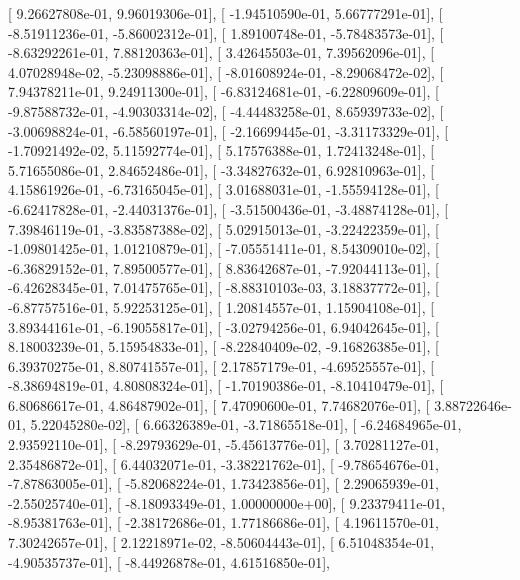 \documentclass{article}
\begin{document}
       [  9.26627808e-01,   9.96019306e-01],
       [ -1.94510590e-01,   5.66777291e-01],
       [ -8.51911236e-01,  -5.86002312e-01],
       [  1.89100748e-01,  -5.78483573e-01],
       [ -8.63292261e-01,   7.88120363e-01],
       [  3.42645503e-01,   7.39562096e-01],
       [  4.07028948e-02,  -5.23098886e-01],
       [ -8.01608924e-01,  -8.29068472e-02],
       [  7.94378211e-01,   9.24911300e-01],
       [ -6.83124681e-01,  -6.22809609e-01],
       [ -9.87588732e-01,  -4.90303314e-02],
       [ -4.44483258e-01,   8.65939733e-02],
       [ -3.00698824e-01,  -6.58560197e-01],
       [ -2.16699445e-01,  -3.31173329e-01],
       [ -1.70921492e-02,   5.11592774e-01],
       [  5.17576388e-01,   1.72413248e-01],
       [  5.71655086e-01,   2.84652486e-01],
       [ -3.34827632e-01,   6.92810963e-01],
       [  4.15861926e-01,  -6.73165045e-01],
       [  3.01688031e-01,  -1.55594128e-01],
       [ -6.62417828e-01,  -2.44031376e-01],
       [ -3.51500436e-01,  -3.48874128e-01],
       [  7.39846119e-01,  -3.83587388e-02],
       [  5.02915013e-01,  -3.22422359e-01],
       [ -1.09801425e-01,   1.01210879e-01],
       [ -7.05551411e-01,   8.54309010e-02],
       [ -6.36829152e-01,   7.89500577e-01],
       [  8.83642687e-01,  -7.92044113e-01],
       [ -6.42628345e-01,   7.01475765e-01],
       [ -8.88310103e-03,   3.18837772e-01],
       [ -6.87757516e-01,   5.92253125e-01],
       [  1.20814557e-01,   1.15904108e-01],
       [  3.89344161e-01,  -6.19055817e-01],
       [ -3.02794256e-01,   6.94042645e-01],
       [  8.18003239e-01,   5.15954833e-01],
       [ -8.22840409e-02,  -9.16826385e-01],
       [  6.39370275e-01,   8.80741557e-01],
       [  2.17857179e-01,  -4.69525557e-01],
       [ -8.38694819e-01,   4.80808324e-01],
       [ -1.70190386e-01,  -8.10410479e-01],
       [  6.80686617e-01,   4.86487902e-01],
       [  7.47090600e-01,   7.74682076e-01],
       [  3.88722646e-01,   5.22045280e-02],
       [  6.66326389e-01,  -3.71865518e-01],
       [ -6.24684965e-01,   2.93592110e-01],
       [ -8.29793629e-01,  -5.45613776e-01],
       [  3.70281127e-01,   2.35486872e-01],
       [  6.44032071e-01,  -3.38221762e-01],
       [ -9.78654676e-01,  -7.87863005e-01],
       [ -5.82068224e-01,   1.73423856e-01],
       [  2.29065939e-01,  -2.55025740e-01],
       [ -8.18093349e-01,   1.00000000e+00],
       [  9.23379411e-01,  -8.95381763e-01],
       [ -2.38172686e-01,   1.77186686e-01],
       [  4.19611570e-01,   7.30242657e-01],
       [  2.12218971e-02,  -8.50604443e-01],
       [  6.51048354e-01,  -4.90535737e-01],
       [ -8.44926878e-01,   4.61516850e-01],
\end{document}
